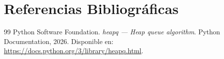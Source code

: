 \section{Referencias Bibliográficas}

\begin{thebibliography}{99}
Python Software Foundation.
\newblock \emph{heapq --- Heap queue algorithm}.
\newblock Python Documentation, 2026.
\newblock Disponible en: \url{https://docs.python.org/3/library/heapq.html}.
\end{thebibliography}
